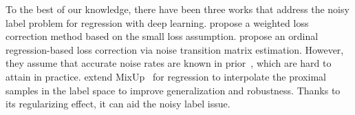\documentclass{article}
\theoremstyle{plain}
\theoremstyle{definition}
\theoremstyle{remark}
\begin{document}
To the best of our knowledge, there have been three works that address the noisy label problem for regression with deep learning. 
\citet{castells20} propose a weighted loss correction method based on the small loss assumption.
\citet{garg2020robust} propose an ordinal regression-based loss correction via noise 
transition matrix estimation.
However, they assume that accurate noise rates are known in prior~\citep{patrini17}, which are hard to attain in practice. 
\citet{yao22cmixup} extend MixUp~\citep{zhang18mixup} for regression to interpolate 
the proximal samples in the label space to improve generalization and robustness.
Thanks to its regularizing effect, it can aid the noisy label issue.
\end{document}

